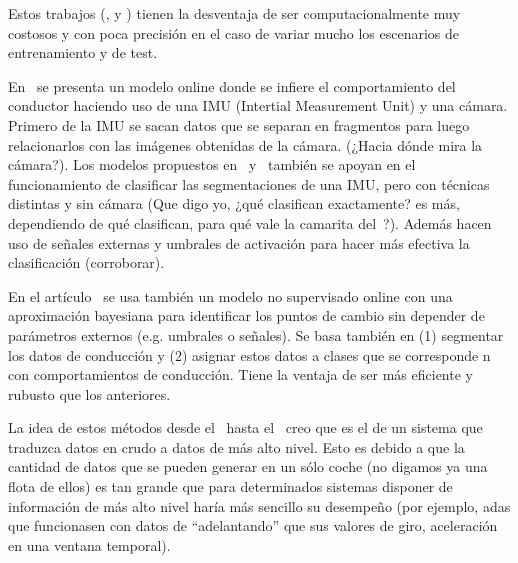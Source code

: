 Estos trabajos (\cite{sekizawa2007modeling}, \cite{terada2010multi} y \cite{bando2013unsupervised}) tienen la desventaja de ser computacionalmente muy costosos y con poca precisión en el caso de variar mucho los escenarios de entrenamiento y de test.

En~\cite{maye2011bayesian} se presenta un modelo online donde se infiere el comportamiento del conductor haciendo uso de una IMU (Intertial Measurement Unit) y una cámara. Primero de la IMU se sacan datos que se separan en fragmentos para luego relacionarlos con las imágenes obtenidas de la cámara. (\TODO ¿Hacia dónde mira la cámara?). Los modelos propuestos en~\cite{johnson2011driving} y~\cite{van2013driver} también se apoyan en el funcionamiento de clasificar las segmentaciones de una IMU, pero con técnicas distintas y sin cámara (\TODO Que digo yo, ¿qué clasifican exactamente? es más, dependiendo de qué clasifican, para qué vale la camarita del~\cite{maye2011bayesian}?). Además hacen uso de señales externas y umbrales de activación para hacer más efectiva la clasificación (\TODO corroborar).

En el artículo~\cite{bender2015unsupervised} se usa también un modelo no supervisado online con una aproximación bayesiana para identificar los puntos de cambio sin depender de parámetros externos (e.g. umbrales o señales). Se basa también en (1) segmentar los datos de conducción y (2) asignar estos datos a clases que se corresponde n con comportamientos de conducción. Tiene la ventaja de ser más eficiente y rubusto que los anteriores.

La idea de estos métodos desde el~\cite{sekizawa2007modeling} hasta el~\cite{bender2015unsupervised} creo que es el de un sistema que traduzca datos en crudo a datos de más alto nivel. Esto es debido a que la cantidad de datos que se pueden generar en un sólo coche (no digamos ya una flota de ellos) es tan grande que para determinados sistemas disponer de información de más alto nivel haría más sencillo su desempeño (por ejemplo, \gls{adas} que funcionasen con datos de \enquote{adelantando} que sus valores de giro, aceleración en una ventana temporal).